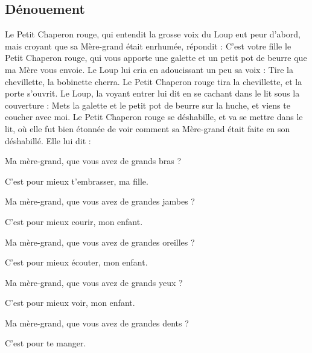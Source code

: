\documentclass[a4paper,11pt]{article}
\begin{document}
\subsection{Dénouement}
Le Petit Chaperon rouge, qui entendit la grosse voix du Loup eut peur d'abord, mais croyant que sa Mère-grand était enrhumée, répondit : C'est votre fille le Petit Chaperon rouge, qui vous apporte une galette et un petit pot de beurre que ma Mère vous envoie. Le Loup lui cria en adoucissant un peu sa voix : Tire la chevillette, la bobinette cherra. Le Petit Chaperon rouge tira la chevillette, et la porte s'ouvrit. Le Loup, la voyant entrer lui dit en se cachant dans le lit sous la couverture : Mets la galette et le petit pot de beurre sur la huche, et viens te coucher avec moi. Le Petit Chaperon rouge se déshabille, et va se mettre dans le lit, où elle fut bien étonnée de voir comment sa Mère-grand était faite en son déshabillé. Elle lui dit :
\begin{flushleft}
Ma mère-grand, que vous avez de grands bras ?
\end{flushleft}
\begin{center}
 C'est pour mieux t'embrasser, ma fille.
\end{center}

\large
\begin{flushleft}
Ma mère-grand, que vous avez de grandes jambes ?
\end{flushleft}
\begin{center}
C'est pour mieux courir, mon enfant.
\end{center}

\Large
\begin{flushleft}
Ma mère-grand, que vous avez de grandes oreilles ?
\end{flushleft}
\begin{center}
C'est pour mieux écouter, mon enfant.
\end{center}
 
\LARGE
\begin{flushleft}
Ma mère-grand, que vous avez de grands yeux ?
\end{flushleft}
\begin{center}
C'est pour mieux voir, mon enfant.
\end{center}
	 
\huge
\begin{flushleft}
Ma mère-grand, que vous avez de grandes dents ?
\end{flushleft}
\begin{center}
C'est pour te manger.
\end{center}
		
\end{document}
